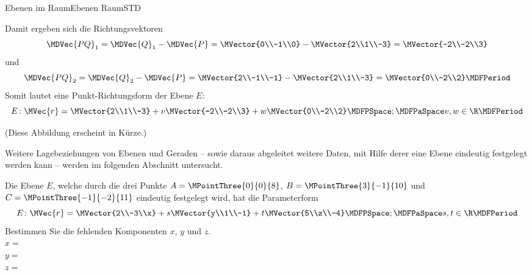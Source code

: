 \begin{MXContent}{Ebenen im Raum}{Ebenen Raum}{STD}
\begin{MExample}
\[\]
Damit ergeben sich die Richtungsvektoren
\[
 \MDVec{P Q}_1=\MDVec{Q}_1 - \MDVec{P} = \MVector{0\\-1\\0} - \MVector{2\\1\\-3} = \MVector{-2\\-2\\3}
\]
und
\[
 \MDVec{P Q}_2=\MDVec{Q}_2 - \MDVec{P} = \MVector{2\\-1\\-1} - \MVector{2\\1\\-3} = \MVector{0\\-2\\2} \MDFPeriod
\]
Somit lautet eine Punkt-Richtungsform der Ebene $E$:
\[
 E\colon\MVec{r}=\MVector{2\\1\\-3}+v\MVector{-2\\-2\\3}+w\MVector{0\\-2\\2}\MDFPSpace;\MDFPaSpace v,w\in\R \MDFPeriod
\]

(Diese Abbildung erscheint in Kürze.)
\end{MExample}

Weitere Lagebeziehungen von Ebenen und Geraden -- sowie daraus abgeleitet weitere Daten, mit Hilfe derer eine Ebene eindeutig festgelegt werden kann -- werden im folgenden Abschnitt  untersucht.

\begin{MExercise}
Die Ebene $E$, welche durch die drei Punkte $A=\MPointThree{0}{0}{8}$, $B=\MPointThree{3}{-1}{10}$ und $C=\MPointThree{-1}{-2}{11}$ eindeutig festgelegt wird, hat die Parameterform
\[
 E\colon\MVec{r}=\MVector{2\\-3\\x}+s\MVector{y\\1\\-1}+t\MVector{5\\z\\-4}\MDFPSpace;\MDFPaSpace s,t\in\R \MDFPeriod
\]
Bestimmen Sie die fehlenden Komponenten $x$, $y$ und $z$.\\
$x=$\\
$y=$\\
$z=$\\


\end{MExercise}
\end{MXContent}
